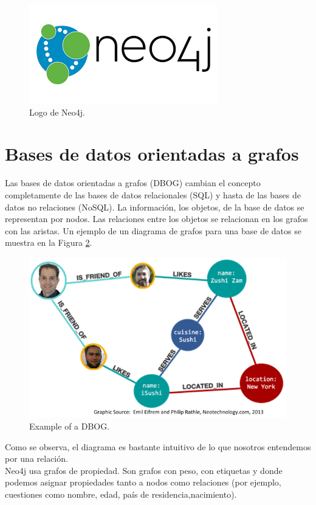 \documentclass[conference]{IEEEtran}
\begin{document}
\begin{figure}[H]
\begin{center}
\includegraphics[width= 0.45 \textwidth]{neo4j_logo.png}
\end{center}
\caption{Logo de Neo4j.}
\label{fig1}
\end{figure}


\section{Bases de datos orientadas a grafos}

Las bases de datos orientadas a grafos (DBOG) cambian el concepto completamente de las bases de datos relacionales (SQL) y hasta de las bases de datos no relaciones (NoSQL). La información, los objetos, de la base de datos se representan por nodos. Las relaciones entre los objetos se relacionan en los grafos con las aristas. Un ejemplo de un diagrama de grafos para una base de datos se muestra en la Figura \ref{fig2}.

\begin{figure}[H]
\begin{center}
\includegraphics[width= 0.45 \textwidth]{graphDB.png}
\end{center}
\caption{Example of a DBOG.}
\label{fig2}
\end{figure}

Como se observa, el diagrama es bastante intuitivo de lo que nosotros entendemos por una relación. \\
Neo4j usa grafos de propiedad. Son grafos con peso, con etiquetas y donde podemos asignar propiedades tanto a nodos como relaciones (por
ejemplo, cuestiones como nombre, edad, país de residencia,nacimiento). 
\end{document}
